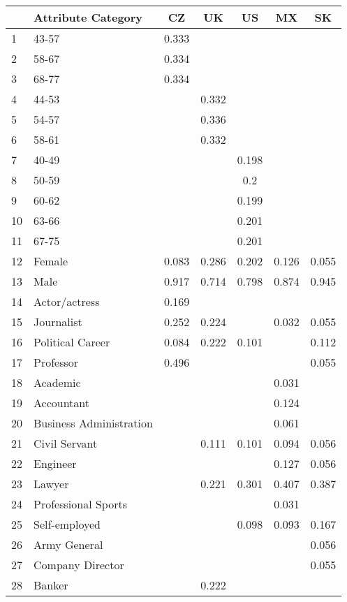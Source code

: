 \begin{longtable}{lp{7cm}ccccc}
  \toprule
 & Attribute Category & CZ & UK & US & MX & SK \\ 
  \midrule
1 & 43-57 & 0.333 &  &  &  &  \\ 
  2 & 58-67 & 0.334 &  &  &  &  \\ 
  3 & 68-77 & 0.334 &  &  &  &  \\ 
  4 & 44-53 &  & 0.332 &  &  &  \\ 
  5 & 54-57 &  & 0.336 &  &  &  \\ 
  6 & 58-61 &  & 0.332 &  &  &  \\ 
  7 & 40-49 &  &  & 0.198 &  &  \\ 
  8 & 50-59 &  &  & 0.2 &  &  \\ 
  9 & 60-62 &  &  & 0.199 &  &  \\ 
  10 & 63-66 &  &  & 0.201 &  &  \\ 
  11 & 67-75 &  &  & 0.201 &  &  \\ 
  12 & Female & 0.083 & 0.286 & 0.202 & 0.126 & 0.055 \\ 
  13 & Male & 0.917 & 0.714 & 0.798 & 0.874 & 0.945 \\ 
  14 & Actor/actress & 0.169 &  &  &  &  \\ 
  15 & Journalist & 0.252 & 0.224 &  & 0.032 & 0.055 \\ 
  16 & Political Career & 0.084 & 0.222 & 0.101 &  & 0.112 \\ 
  17 & Professor & 0.496 &  &  &  & 0.055 \\ 
  18 & Academic &  &  &  & 0.031 &  \\ 
  19 & Accountant &  &  &  & 0.124 &  \\ 
  20 & Business Administration &  &  &  & 0.061 &  \\ 
  21 & Civil Servant &  & 0.111 & 0.101 & 0.094 & 0.056 \\ 
  22 & Engineer &  &  &  & 0.127 & 0.056 \\ 
  23 & Lawyer &  & 0.221 & 0.301 & 0.407 & 0.387 \\ 
  24 & Professional Sports &  &  &  & 0.031 &  \\ 
  25 & Self-employed &  &  & 0.098 & 0.093 & 0.167 \\ 
  26 & Army General &  &  &  &  & 0.056 \\ 
  27 & Company Director &  &  &  &  & 0.055 \\ 
  28 & Banker &  & 0.222 &  &  &  \\ 

\end{longtable}
